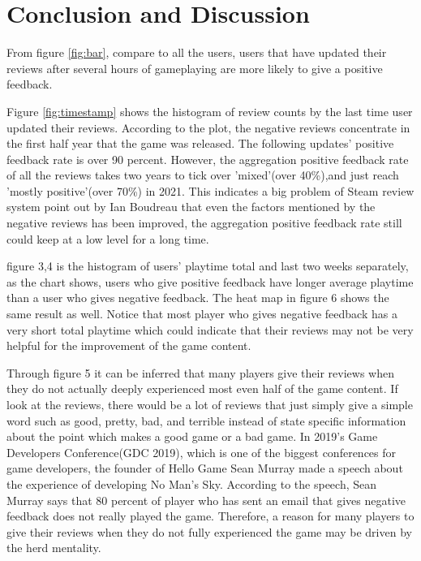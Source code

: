 \documentclass[12pt]{article}
\begin{document}
\newpage
\section{Conclusion and Discussion}
\label{Conlusion}
From figure \ref{fig:bar}, compare to all the users, users that have updated their reviews after several hours of gameplaying are more likely to give a positive feedback.

Figure \ref{fig:timestamp} shows the histogram of review counts by the last time user updated their reviews. According to the plot, the negative reviews concentrate in the first half year that the game was released. The following updates' positive feedback rate is over 90 percent. However, the aggregation positive feedback rate of all the reviews takes two years to tick over 'mixed'(over 40\%),and just reach 'mostly positive'(over 70\%) in 2021. This indicates a big problem of Steam review system point out by Ian Boudreau that even the factors mentioned by the negative reviews has been improved, the aggregation positive feedback rate still could keep at a low level for a long time.

figure 3,4 is the histogram of users' playtime total and last two weeks separately, as the chart shows, users who give positive feedback have longer average playtime than a user who gives negative feedback. The heat map in figure 6 shows the same result as well. Notice that most player who gives negative feedback has a very short total playtime which could indicate that their reviews may not be very helpful for the improvement of the game content.


Through figure 5 it can be inferred that many players give their reviews when they do not actually deeply experienced most even half of the game content. If look at the reviews, there would be a lot of reviews that just simply give a simple word such as good, pretty, bad, and terrible instead of state specific information about the point which makes a good game or a bad game. In 2019's Game Developers Conference(GDC 2019), which is one of the biggest conferences for game developers, the founder of Hello Game Sean Murray made a speech about the experience of developing No Man's Sky. According to the speech, Sean Murray says that 80 percent of player who has sent an email that gives negative feedback does not really played the game. Therefore, a reason for many players to give their reviews when they do not fully experienced the game may be driven by the herd mentality. 
\end{document}
